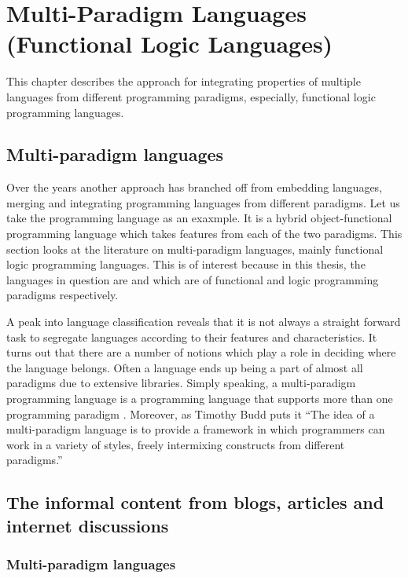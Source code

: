 \documentclass[thesis-solanki.tex]{subfiles}
\begin{document}
\chapter{Multi-Paradigm Languages (Functional Logic Languages)}\label{chap:multiparadigm}


This chapter describes the approach for integrating properties of multiple languages from different programming
paradigms, especially, functional logic programming languages.

\section{Multi-paradigm languages}
Over the years another approach has branched off from embedding languages, merging and integrating programming
languages from different paradigms.
Let us take the  programming language \cite{website:scala} as an exaxmple. It is a hybrid
object-functional programming language which takes features from each of the two paradigms.
This section looks at the literature on multi-paradigm languages, mainly functional logic programming
languages. This is of interest because in this thesis, the languages in question are  
and  which are of functional and logic programming paradigms respectively.

A peak into language classification reveals that it is not always a straight forward task to segregate languages
according to their features and characteristics.
It turns out that there are a number of notions which play a role in deciding where the language belongs.
Often a language ends up being a part of almost all paradigms due to extensive libraries.
Simply speaking, a multi-paradigm programming language is a programming language that supports more than one
programming paradigm \cite{Krishnamurthi:2008:TPL:1480828.1480846}. Moreover, as Timothy Budd puts it
\cite{website:wikimultiparadigm} ``The idea of a multi-paradigm language is to provide a framework in which
programmers can work in a variety of styles, freely intermixing constructs from different paradigms.''


\section{The informal content from blogs, articles and internet discussions}
  
\subsection{Multi-paradigm languages}
\end{document}
